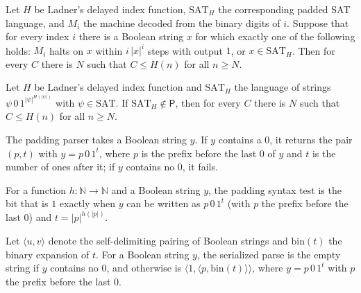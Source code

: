 \begin{theorem}
\label{Complexity.ladner_selector_threshold}
\leanok
{}
Let $H$ be Ladner's delayed index function, $\mathrm{SAT}_H$ the corresponding padded SAT
language, and $M_i$ the machine decoded from the binary digits of $i$. Suppose that for
every index $i$ there is a Boolean string $x$ for which exactly one of the following holds:
$M_i$ halts on $x$ within $i\,|x|^i$ steps with output $1$, or $x\in\mathrm{SAT}_H$. Then for every $C$ there is $N$ such that $C\le H(n)$ for all $n\ge N$.
\end{theorem}

\begin{theorem}
\label{Complexity.ladnerH_unbounded_of_not_mem_P}
\leanok
{}
Let $H$ be Ladner's delayed index function and $\mathrm{SAT}_H$ the language of strings
$\psi\,0\,1^{|\psi|^{H(|\psi|)}}$ with $\psi\in\mathrm{SAT}$. If
$\mathrm{SAT}_H\notin\mathsf{P}$, then for every $C$ there is $N$ such that $C\le H(n)$ for
all $n\ge N$.
\end{theorem}

\begin{definition}
\label{Complexity.ladner_parse}
\leanok
The padding parser takes a Boolean string $y$. If $y$ contains a $0$, it returns the pair
$(p,t)$ with $y=p\,0\,1^t$, where $p$ is the prefix before the last $0$ of $y$ and $t$ is
the number of ones after it; if $y$ contains no $0$, it fails.
\end{definition}

\begin{definition}
\label{Complexity.ladner_padSyntax}
\leanok
{}
For a function $h:\mathbb N\to\mathbb N$ and a Boolean string $y$, the padding syntax test
is the bit that is $1$ exactly when $y$ can be written as $p\,0\,1^t$ (with $p$ the prefix
before the last $0$) and $t=|p|^{h(|p|)}$.
\end{definition}

\begin{definition}
\label{Complexity.ladner_parseWord}
\leanok
{}
Let $\langle u,v\rangle$ denote the self-delimiting pairing of Boolean strings and
$\mathrm{bin}(t)$ the binary expansion of $t$. For a Boolean string $y$, the serialized
parse is the empty string if $y$ contains no $0$, and otherwise is
$\langle 1,\langle p,\mathrm{bin}(t)\rangle\rangle$, where $y=p\,0\,1^t$ with $p$ the
prefix before the last $0$.
\end{definition}

